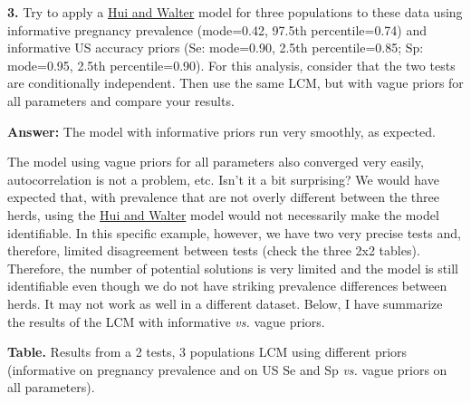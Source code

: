 \documentclass[
]{book}
\begin{document}
\textbf{3.} Try to apply a \href{https://www.jstor.org/stable/2530508?seq=1}{Hui and Walter} model for three populations to these data using informative pregnancy prevalence (mode=0.42, 97.5th percentile=0.74) and informative US accuracy priors (Se: mode=0.90, 2.5th percentile=0.85; Sp: mode=0.95, 2.5th percentile=0.90). For this analysis, consider that the two tests are conditionally independent. Then use the same LCM, but with vague priors for all parameters and compare your results.

\textbf{Answer:} The model with informative priors run very smoothly, as expected.

The model using vague priors for all parameters also converged very easily, autocorrelation is not a problem, etc. Isn't it a bit surprising? We would have expected that, with prevalence that are not overly different between the three herds, using the \href{https://www.jstor.org/stable/2530508?seq=1}{Hui and Walter} model would not necessarily make the model identifiable. In this specific example, however, we have two very precise tests and, therefore, limited disagreement between tests (check the three 2x2 tables). Therefore, the number of potential solutions is very limited and the model is still identifiable even though we do not have striking prevalence differences between herds. It may not work as well in a different dataset. Below, I have summarize the results of the LCM with informative \emph{vs.} vague priors.

\textbf{Table.} Results from a 2 tests, 3 populations LCM using different priors (informative on pregnancy prevalence and on US Se and Sp \emph{vs.} vague priors on all parameters).
\end{document}
